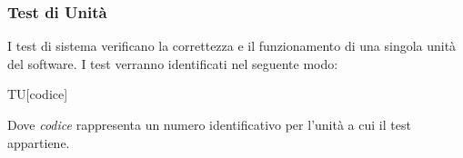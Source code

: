 \documentclass[../piano-di-qualifica.tex]{subfiles}
\begin{document}
  \subsubsection{Test di Unità}%
  \label{subs:unita}
    I test di sistema verificano la correttezza e il funzionamento di una singola unità del software. I test verranno identificati nel seguente modo:
    \begin{center}
      TU[codice]
    \end{center}
    Dove \textit{codice} rappresenta un numero identificativo per l'unità a cui il test appartiene.
\end{document}
